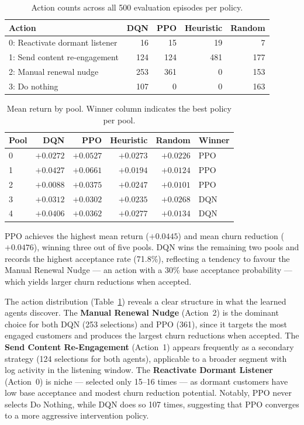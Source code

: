 \documentclass{article}
\begin{document}
\begin{table}[H]
\centering
\caption{Action counts across all 500 evaluation episodes per policy.}
\label{tab:action_counts}
\begin{tabular}{lrrrr}
\toprule
\textbf{Action} & \textbf{DQN} & \textbf{PPO} & \textbf{Heuristic} & \textbf{Random} \\
\midrule
0: Reactivate dormant listener &  16 &  15 &  19 &   7 \\
1: Send content re-engagement  & 124 & 124 & 481 & 177 \\
2: Manual renewal nudge        & 253 & 361 &   0 & 153 \\
3: Do nothing                  & 107 &   0 &   0 & 163 \\
\bottomrule
\end{tabular}
\end{table}

\begin{table}[H]
\centering
\caption{Mean return by pool. Winner column indicates the best policy per pool.}
\label{tab:pool_returns}
\begin{tabular}{lrrrrl}
\toprule
\textbf{Pool} & \textbf{DQN} & \textbf{PPO} & \textbf{Heuristic} & \textbf{Random} & \textbf{Winner} \\
\midrule
0 & $+0.0272$ & $+0.0527$ & $+0.0273$ & $+0.0226$ & PPO \\
1 & $+0.0427$ & $+0.0661$ & $+0.0194$ & $+0.0124$ & PPO \\
2 & $+0.0088$ & $+0.0375$ & $+0.0247$ & $+0.0101$ & PPO \\
3 & $+0.0312$ & $+0.0302$ & $+0.0235$ & $+0.0268$ & DQN \\
4 & $+0.0406$ & $+0.0362$ & $+0.0277$ & $+0.0134$ & DQN \\
\bottomrule
\end{tabular}
\end{table}

PPO achieves the highest mean return ($+0.0445$) and mean churn reduction ($+0.0476$),
winning three out of five pools. DQN wins the remaining two pools and records the highest
acceptance rate (71.8\%), reflecting a tendency to favour the Manual Renewal Nudge — an
action with a 30\% base acceptance probability — which yields larger churn reductions when
accepted.

The action distribution (Table~\ref{tab:action_counts}) reveals a clear structure in what
the learned agents discover. The \textbf{Manual Renewal Nudge} (Action~2) is the dominant
choice for both DQN (253 selections) and PPO (361), since it targets the most engaged
customers and produces the largest churn reductions when accepted. The \textbf{Send Content
Re-Engagement} (Action~1) appears frequently as a secondary strategy (124 selections for
both agents), applicable to a broader segment with log activity in the listening window.
The \textbf{Reactivate Dormant Listener} (Action~0) is niche — selected only 15--16 times —
as dormant customers have low base acceptance and modest churn reduction potential. Notably,
PPO never selects Do Nothing, while DQN does so 107 times, suggesting that PPO converges to
a more aggressive intervention policy.
\end{document}
